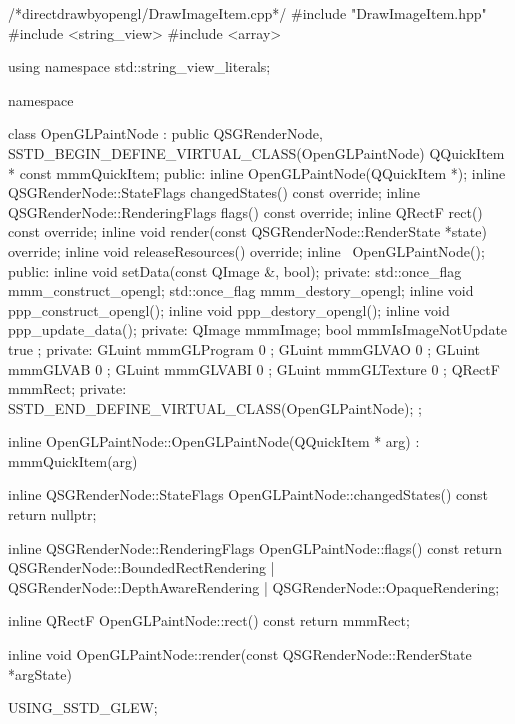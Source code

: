 \label{f000090}    %
\FloatBarrier                                  %
\begin{thebookfilesourceone}[escapeinside={(*@}{@*)},
caption=GoodLuck,
title=\filesourcenumbernameone \thefilesourcenumber
]
/*directdrawbyopengl/DrawImageItem.cpp*/
#include "DrawImageItem.hpp"
#include <string_view>
#include <array>

using namespace std::string_view_literals;

namespace {

    class OpenGLPaintNode :
        public QSGRenderNode,
        SSTD_BEGIN_DEFINE_VIRTUAL_CLASS(OpenGLPaintNode) {
        QQuickItem * const mmmQuickItem;
    public:
        inline OpenGLPaintNode(QQuickItem *);
        inline QSGRenderNode::StateFlags changedStates() const override;
        inline QSGRenderNode::RenderingFlags flags() const override;
        inline QRectF rect() const override;
        inline void render(const QSGRenderNode::RenderState *state) override;
        inline void releaseResources() override;
        inline ~OpenGLPaintNode();
    public:
        inline void setData(const QImage &, bool);
    private:
        std::once_flag mmm_construct_opengl;
        std::once_flag mmm_destory_opengl;
        inline void ppp_construct_opengl();
        inline void ppp_destory_opengl();
        inline void ppp_update_data();
    private:
        QImage mmmImage;
        bool mmmIsImageNotUpdate{ true };
    private:
        GLuint mmmGLProgram{ 0 };
        GLuint mmmGLVAO{ 0 };
        GLuint mmmGLVAB{ 0 };
        GLuint mmmGLVABI{ 0 };
        GLuint mmmGLTexture{ 0 };
        QRectF mmmRect;
    private:
        SSTD_END_DEFINE_VIRTUAL_CLASS(OpenGLPaintNode);
    };

    inline OpenGLPaintNode::OpenGLPaintNode(QQuickItem * arg) :
        mmmQuickItem(arg) {
    }

    inline QSGRenderNode::StateFlags OpenGLPaintNode::changedStates() const {
        return nullptr;
    }

    inline QSGRenderNode::RenderingFlags OpenGLPaintNode::flags() const {
        return QSGRenderNode::BoundedRectRendering |
            QSGRenderNode::DepthAwareRendering |
            QSGRenderNode::OpaqueRendering;
    }

    inline QRectF OpenGLPaintNode::rect() const {
        return mmmRect;
    }

    inline void OpenGLPaintNode::render(const QSGRenderNode::RenderState *argState) {
        USING_SSTD_GLEW;

}}
\end{thebookfilesourceone}
